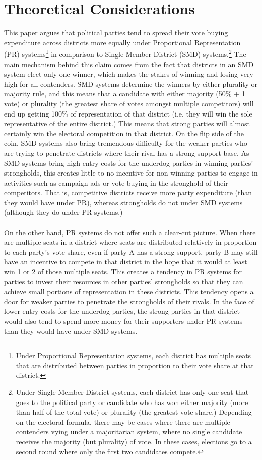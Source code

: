 \documentclass{article}
\begin{document}
\section{Theoretical Considerations}
This paper argues that political parties tend to spread their vote buying expenditure across districts more equally under Proportional Representation (PR) systems\footnote{Under Proportional Representation systems, each district has multiple seats that are distributed between parties in proportion to their vote share at that district.} in comparison to Single Member District (SMD) systems.\footnote{Under Single Member District systems, each district has only one seat that goes to the political party or candidate who has won either majority (more than half of the total vote) or plurality (the greatest vote share.) Depending on the electoral formula, there may be cases where there are multiple contenders vying under a majoritarian system, where no single candidate receives the majority (but plurality) of vote. In these cases, elections go to a second round where only the first two candidates compete.} The main mechanism behind this claim comes from the fact that districts in an SMD system elect only one winner, which makes the stakes of winning and losing very high for all contenders. SMD systems determine the winners by either plurality or majority rule, and this means that a candidate with either majority (50\% + 1 vote) or plurality (the greatest share of votes amongst multiple competitors) will end up getting 100\% of representation of that district (i.e. they will win the sole representative of the entire district.) This means that strong parties will almost certainly win the electoral competition in that district. On the flip side of the coin, SMD systems also bring tremendous difficulty for the weaker parties who are trying to penetrate districts where their rival has a strong support base. As SMD systems bring high entry costs for the underdog parties in winning parties’ strongholds, this creates little to no incentive for non-winning parties to engage in activities such as campaign ads or vote buying in the stronghold of their competitors. That is, competitive districts receive more party expenditure (than they would have under PR), whereas strongholds do not under SMD systems (although they do under PR systems.)\\ 
\\
On the other hand, PR systems do not offer such a clear-cut picture. When there are multiple seats in a district where seats are distributed relatively in proportion to each party’s vote share, even if party A has a strong support, party B may still have an incentive to compete in that district in the hope that it would at least win 1 or 2 of those multiple seats. This creates a tendency in PR systems for parties to invest their resources in other parties' strongholds so that they can achieve small portions of representation in these districts. This tendency opens a door for weaker parties to penetrate the strongholds of their rivals. In the face of lower entry costs for the underdog parties, the strong parties in that district would also tend to spend more money for their supporters under PR systems than they would have under SMD systems.\\
\end{document}

